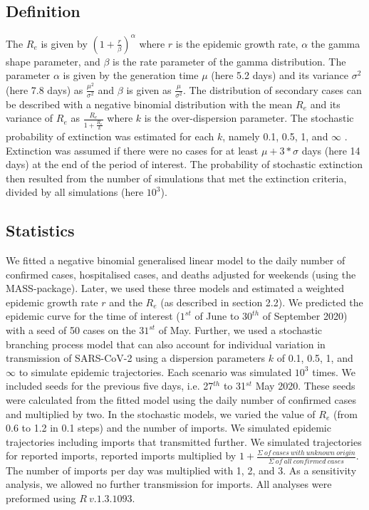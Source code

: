 \documentclass[10pt, a4paper, twoside]{article}
\begin{document}
\begin{multicols}{2}
\subsection{Definition}
The $R_e$ is given by $(1 + \frac{r}{\beta} )^\alpha$ where $r$ is the epidemic growth rate, $\alpha$ the gamma shape parameter, and $\beta$ is the rate parameter of the gamma distribution. 
The parameter $\alpha$ is given by the generation time $\mu$ (here 5.2 days) and its variance $\sigma^2$ (here 7.8 days) as $\frac{\mu^2}{\sigma^2 }$ and $\beta$ is given as $\frac{\mu}{\sigma^2}$. 
The distribution of secondary cases can be described with a negative binomial distribution with the mean $R_e$ and its variance of $R_e$ as $\frac{R_e}{1+\frac{R_e}{k}}$ where $k$ is the over-dispersion parameter. 
The stochastic probability of extinction was estimated for each $k$, namely 0.1, 0.5, 1, and  $\infty$ . 
Extinction was assumed if there were no cases for at least $\mu + 3*\sigma$ days (here 14 days) at the end of the period of interest.
The probability of stochastic extinction then resulted from the number of simulations that met the extinction criteria, divided by all simulations (here $10^3$).

\subsection{Statistics}
We fitted a negative binomial generalised linear model to the daily number of confirmed cases, hospitalised cases, and deaths adjusted for weekends (using the MASS-package).\cite{venables_modern_2002} 
Later, we used these three models and estimated a weighted epidemic growth rate $r$ and the $R_e$ (as described in section 2.2). 
We predicted the epidemic curve for the time of interest ($1^{st}$ of June to $30^{th}$ of September 2020) with a seed of 50 cases on the $31^{st}$ of May. 
Further, we used a stochastic branching process model that can also account for individual variation in transmission of SARS-CoV-2 using a dispersion parameters $k$ of 0.1, 0.5, 1, and  $\infty$ to simulate epidemic trajectories. 
Each scenario was simulated $10^3$ times.
We included seeds for the previous five days, i.e. 27$^{th}$ to 31$^{st}$ May 2020.
These seeds were calculated from the fitted model using the daily number of confirmed cases and multiplied by two.
In the stochastic models, we varied the value of $R_e$ (from 0.6 to 1.2 in 0.1 steps) and the number of imports.
We simulated epidemic trajectories including imports that transmitted further. 
We simulated trajectories for reported imports, reported imports multiplied by $1+ \frac{\Sigma ~of ~cases ~with ~unknown ~origin }{\Sigma ~of ~all ~confirmed ~cases}$. 
The number of imports per day was multiplied with 1, 2, and 3. 
As a sensitivity analysis, we allowed no further transmission for imports. 
All analyses were preformed using $R ~v.1.3.1093$.\cite{r_core_team_r_2020}



\end{multicols}
\end{document}
